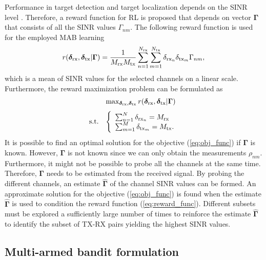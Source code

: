 \documentclass[english, 12pt, a4paper, elec, utf8, a-1b, online]{aaltothesis}
\numberwithin{equation}{section}
\newcommand{\esinrexp}{\Gamma_{nm}}
\newcommand{\vsinrexp}{\boldsymbol{\Gamma}}
\newcommand{\vsinrb}{\widehat{\boldsymbol{\Gamma}}}
\newcommand{\easvtx}{\delta_{\text{tx}_m}}
\newcommand{\vasvtx}{\boldsymbol{\delta}_{\text{tx}}}
\newcommand{\easvrx}{\delta_{\text{rx}_n}}
\newcommand{\vasvrx}{\boldsymbol{\delta}_{\text{rx}}}
\newcommand{\esp}{\rho_{nm}}
\begin{document}
Performance in target detection and target localization depends on the SINR level \cite{Aittomäki2011, Godrich2011, Sun2014}.
Therefore, a reward function for RL is proposed that depends on vector $\vsinrexp$ that consists of all the SINR values $\esinrexp$.
The following reward function is used for the employed MAB learning
\begin{equation}\label{eq:reward_func}
    r(\vasvrx, \vasvtx | \vsinrexp) = \frac{1}{\srx \stx}\sum_{n=1}^\nrx \sum_{m=1}^\ntx  \easvrx \easvtx \esinrexp,
\end{equation}
which is a mean of SINR values for the selected channels on a linear scale.
Furthermore, the reward maximization problem can be formulated as
\begin{equation}\label{eq:obj_func}
    \begin{array}{ll}
                &   \max_{\vasvrx, \vasvtx} r(\vasvrx, \vasvtx | \vsinrexp) \\[7pt]
    \text{s.t.} &   
                \left\{\begin{array}{l}
                    \sum_{n=1}^N \easvrx = \srx \\
                    \sum_{m=1}^M \easvtx = \stx.
                \end{array}\right.
    \end{array}
\end{equation}
It is possible to find an optimal solution for the objective (\ref{eq:obj_func}) if $\vsinrexp$ is known.
However, $\vsinrexp$ is not known since we can only obtain the measurements $\esp$. 
Furthermore, it might not be possible to probe all the channels at the same time.
Therefore, $\vsinrexp$ needs to be estimated from the received signal. 
By probing the different channels, an estimate $\vsinrb$ of the channel SINR values can be formed.
An approximate solution for the objective (\ref{eq:obj_func}) is found when the estimate $\vsinrb$ is used to condition the reward function (\ref{eq:reward_func}).
Different subsets must be explored a sufficiently large number of times to reinforce the estimate $\vsinrb$ to identify the subset of TX-RX pairs yielding the highest SINR values.


\subsection{Multi-armed bandit formulation}
\end{document}
